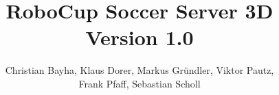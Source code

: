 \documentclass[a4paper,11pt]{scrbook}
\newcommand{\email}[1]{\texttt{$<$#1$>$}}
\begin{document}
\subject{Programming Guide}
\title{RoboCup Soccer Server 3D \\
  {\small Version 1.0}}
\author{
  Christian Bayha,
  Klaus Dorer,
  Markus Gr\"{u}ndler,
  Viktor Pautz,\\
  Frank Pfaff,
  Sebastian Scholl
 }

\lowertitleback{Copyright {\textcopyright} 2001 The RoboCup Federation. Permission is
  granted to copy, distribute and/or modify this document under the
  terms of the GNU Free Documentation License, Version 1.1 or any
  later version published by the Free Software Foundation; with no
  Invariant Sections, with no Front-Cover Texts, and with no
  Back-Cover Texts. A copy of the license is included in the section
  entitled ``GNU Free Documentation License''. }

\maketitle%
\thispagestyle{empty}

\tableofcontents












\end{document}
